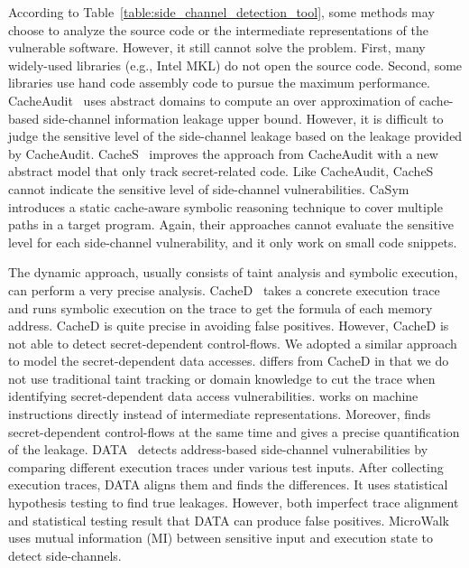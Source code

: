 According to Table~\ref{table:side_channel_detection_tool}, some methods may choose to analyze the source code or the intermediate representations of the vulnerable software. However, it still cannot solve the problem. First, many widely-used libraries (e.g., Intel MKL) do not open the source code. Second, some libraries use hand code assembly code to pursue the maximum performance. CacheAudit~\cite{182946} uses abstract domains to compute an
over approximation of cache-based side-channel information leakage upper bound.
However, it is difficult to judge the sensitive level of the side-channel leakage based on
the leakage provided by CacheAudit. CacheS~\cite{236338} improves the approach from
CacheAudit with a new abstract model that only track
secret-related code. Like CacheAudit, CacheS cannot
indicate the sensitive level of side-channel vulnerabilities.
CaSym~\cite{Brotzman19Casym} introduces a static cache-aware symbolic
reasoning technique to cover multiple paths in a target program. Again, their
approaches cannot evaluate the sensitive level for each side-channel
vulnerability, and it only work on small code snippets.

The dynamic approach, usually consists of taint analysis and symbolic execution,
can perform a very precise analysis. CacheD~\cite{203878} takes a concrete execution trace and runs symbolic execution on the trace
to get the formula of each memory address. CacheD is
quite precise in avoiding false positives. However, CacheD is not able to detect secret-dependent control-flows. We adopted a similar approach to model the secret-dependent data accesses. \tool{} differs from CacheD in that we do not use traditional taint tracking or domain knowledge to cut the trace when identifying secret-dependent data access vulnerabilities. \tool{} works on machine instructions directly instead of intermediate representations. Moreover, \tool{} finds secret-dependent control-flows at the same time and gives a precise quantification of the leakage. DATA~\cite{217537} detects address-based side-channel vulnerabilities by comparing different execution traces under various test inputs. After collecting execution traces, DATA aligns them and finds the differences. It uses statistical hypothesis testing to find true leakages. However, both imperfect trace alignment and statistical testing result that DATA can produce false positives.
MicroWalk~\cite{Wichelmann:2018:MFF:3274694.3274741} uses mutual information (MI) between sensitive input and execution state to detect side-channels.

